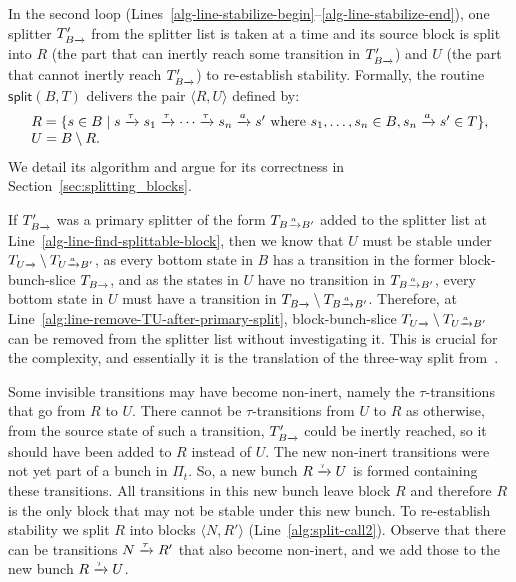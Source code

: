 \documentclass[a4paper,10pt]{article}
\theoremstyle{definition}
\theoremstyle{plain}
\newcommand{\pijl}[1]{\mathrel{\text{$\xrightarrow{\smash[t]{#1}}$}}}
\newcommand{\TB}{T_{B\pijl{}}}
\newcommand{\TBaB}{T_{B\pijl{a} B'}}
\begin{document}
In the second loop (Lines~\ref{alg-line-stabilize-begin}--\ref{alg-line-stabilize-end}), one splitter $\TB'$ from the splitter list is
taken at a time
and its source block is split into $R$ (the part that can inertly reach some transition in $\TB'$) and $U$ (the part that cannot inertly reach $\TB'$) to
re-establish stability.
Formally, the routine $\mathsf{split}(B,T)$ delivers the pair $\langle R,U\rangle$ defined by:
\begin{equation}\begin{array}{l}
\label{eqn:splitproperty}
R =\{ s\in B\mid s\pijl{\tau}s_1\pijl{\tau}\cdots\pijl{\tau}s_n\pijl{a}s'\textrm{ where } s_1,\ldots, s_{n} \in B, s_n\pijl{a}s'\in T\},\\
U = B\setminus R.
\end{array}\end{equation}
We detail its algorithm and argue for its correctness in Section~\ref{sec:splitting_blocks}.

If $\TB'$ was a primary splitter of the form $\TBaB$ added to the splitter list at Line~\ref{alg-line-find-splittable-block},
then we know that $U$ must be stable under $T_{U\pijl{}} \setminus T_{U\pijl{a} B'}$, as
every bottom state in $B$ has a transition in the former block-bunch-slice $\TB$,
and as the states in $U$ have no transition in $\TBaB$,
every bottom state in $U$ must have a transition in $\TB \setminus \TBaB$.
Therefore, at Line~\ref{alg:line-remove-TU-after-primary-split}, block-bunch-slice $T_{U\pijl{}} \setminus T_{U\pijl{a} B'}$ can be removed from the splitter list
without investigating it. This is crucial for the complexity, and essentially it is the translation of the three-way split from~\cite{PT87}.

Some invisible transitions may have become non-inert, namely the $\tau$-transitions that go from $R$ to $U$.
There cannot be $\tau$-transitions from $U$ to $R$ as
otherwise, from the source state of such a transition, $\TB'$ could be inertly reached,
so it should have been added to $R$ instead of $U$.
The new non-inert transitions were not yet part of a bunch in $\Pi_t$.
So, a new bunch $R\pijl{\tau}U$ is formed containing these transitions. All transitions in this new bunch leave block
$R$ and therefore $R$ is the only block that may not be stable under this new bunch. To re-establish stability
we split $R$ into blocks $\langle N, R'\rangle$ (Line~\ref{alg:split-call2}). Observe that there can be transitions $N\pijl{\tau}R'$ that also become
non-inert, and we add those to the new bunch $R\pijl{\tau}U$.
\end{document}
